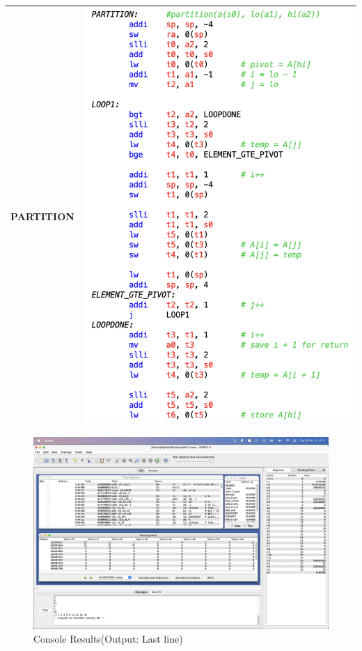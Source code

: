 \documentclass[10pt,a4paper]{article}
\begin{document}
\begin{ans}
\begin{table}[htbp]
\begin{center}
\begin{tabular}[H]{|M{3cm}|M{12cm}|}
					\hline
					PARTITION
					& \includegraphics[scale = 0.8]{Lab1-3-4.png}\\

					\hline
				\end{tabular}
		\end{center} 
    \end{table}

	\begin{figure}[H]
		\caption{Console Results(Output: Last line)}
		\includegraphics[width=1\linewidth]{Lab1-3-1.png}
	\end{figure}
\end{ans}
\end{document}
